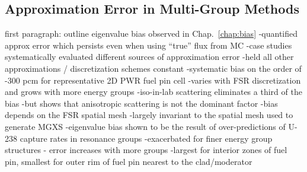 
\subsection{Approximation Error in Multi-Group Methods}
\label{subsec:chap12-approx-error}




first paragraph: outline eigenvalue bias observed in Chap.~\ref{chap:bias}
-quantified approx error which persists even when using ``true'' flux from \ac{MC}
-case studies systematically evaluated different sources of approximation error
  -held all other approximations / discretization schemes constant
-systematic bias on the order of -300 \ac{pcm} for representative 2D \ac{PWR} fuel pin cell
  -varies with \ac{FSR} discretization and grows with more energy groups
  -iso-in-lab scattering eliminates a third of the bias
    -but shows that anisotropic scattering is not the dominant factor
  -bias depends on the \ac{FSR} spatial mesh
    -largely invariant to the spatial mesh used to generate \ac{MGXS}
-eigenvalue bias shown to be the result of over-predictions of U-238 capture rates in resonance groups
  -exacerbated for finer energy group structures - error increases with more groups
  -largest for interior zones of fuel pin, smallest for outer rim of fuel pin nearest to the clad/moderator

